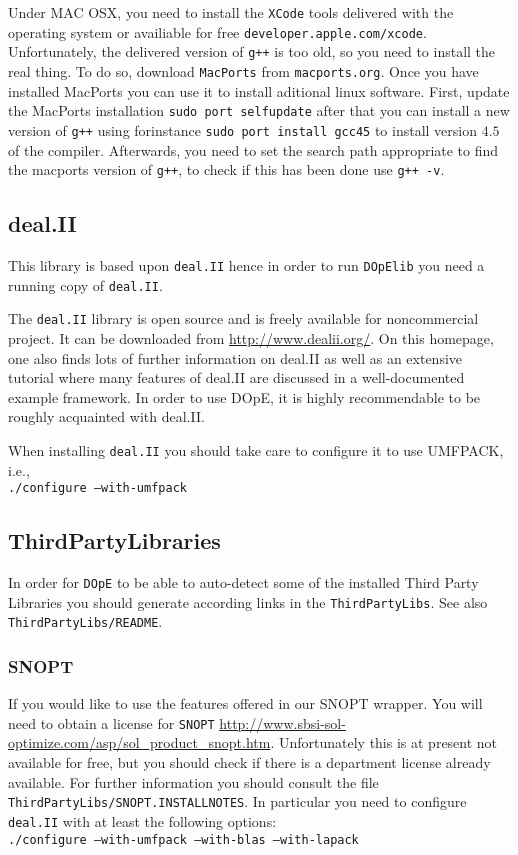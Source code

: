 Under MAC OSX, you need to install the \texttt{XCode} tools delivered with the operating system 
or availiable for free \texttt{developer.apple.com/xcode}. Unfortunately, the delivered 
version of \texttt{g++} is too old, so you need to install the real thing. To do so, 
download \texttt{MacPorts} from \texttt{macports.org}. Once you have installed MacPorts 
you can use it to install aditional linux software. 
First, update the MacPorts installation \texttt{sudo port selfupdate}
after that you can install a new version of \texttt{g++} using forinstance 
\texttt{sudo port install gcc45} to install version $4.5$ of the compiler.
Afterwards, you need to set the search path appropriate to find the macports version
of \texttt{g++}, to check if this has been done use \texttt{g++ -v}.

\subsection{deal.II}
This library is based upon \texttt{deal.II} hence in order to run 
\texttt{DOpElib} you need a running copy of \texttt{deal.II}.

The \texttt{deal.II} library is open source and is freely available for noncommercial project.
It can be downloaded from \url{http://www.dealii.org/}. On this
homepage, one also finds lots of further information on deal.II as well as
an extensive tutorial where many features of deal.II are discussed in a
well-documented example framework. In order to use DOpE, it is highly
recommendable to be roughly acquainted with deal.II.

When installing \texttt{deal.II} you should take care to configure 
it to use UMFPACK, i.e.,\\
\texttt{./configure --with-umfpack}

\subsection{ThirdPartyLibraries}
In order for \texttt{DOpE} to be able to auto-detect some of the installed 
Third Party Libraries you should generate according links in the 
\texttt{ThirdPartyLibs}. See also \texttt{ThirdPartyLibs/README}.

\subsubsection{SNOPT}
If you would like to use the features offered in our SNOPT wrapper. You will 
need to obtain a license for \texttt{SNOPT} 
\url{http://www.sbsi-sol-optimize.com/asp/sol_product_snopt.htm}.
Unfortunately this is at present not available for free, but you should 
check if 
there is a department license already available.
For further information you should consult the file 
\texttt{ThirdPartyLibs/SNOPT.INSTALLNOTES}. In particular you need to configure 
\texttt{deal.II} with at least the following options:\\
\texttt{./configure --with-umfpack --with-blas --with-lapack}

